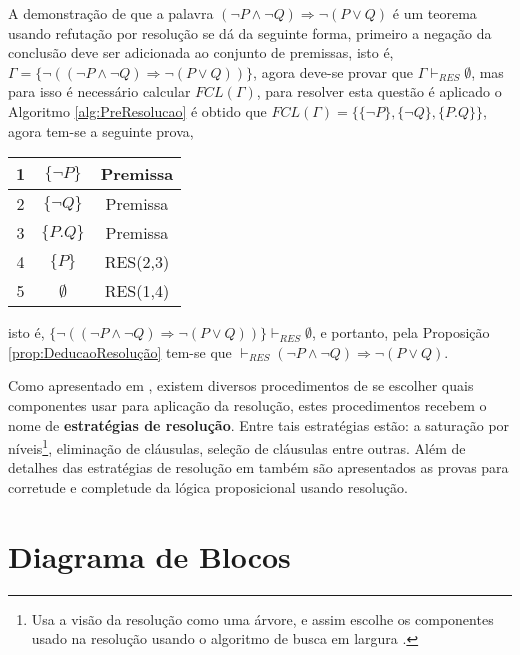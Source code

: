 \begin{exem}
    A demonstração de que a palavra $(\neg P \land \neg Q) \Rightarrow \neg (P \lor Q)$ é um teorema usando refutação por resolução se dá da seguinte forma, primeiro a negação da conclusão deve ser adicionada ao conjunto de premissas, isto é, $\Gamma = \{\neg((\neg P \land \neg Q) \Rightarrow \neg (P \lor Q))\}$, agora deve-se provar que $\Gamma \vdash_{RES} \emptyset$, mas para isso é necessário calcular $FCL(\Gamma)$, para resolver esta questão é aplicado o Algoritmo \ref{alg:PreResolucao} é obtido que $FCL(\Gamma) = \{\{\neg P\}, \{\neg Q\}, \{P. Q\}\}$, agora tem-se a seguinte prova, 
    \begin{table}[ht]
        \centering
        \begin{tabular}{|c|c|c|}
            \hline
            1 & $\{\neg P\}$ & Premissa \\ \hline
            2 & $\{\neg Q\}$ & Premissa \\ \hline
            3 & $\{P. Q\}$ & Premissa \\ \hline
            4 & $\{P\}$ & RES(2,3) \\ \hline
            5 & $\emptyset$ & RES(1,4) \\ \hline
        \end{tabular}
    \end{table}
    
    isto é, $\{\neg((\neg P \land \neg Q) \Rightarrow \neg (P \lor Q))\} \vdash_{RES} \emptyset$, e portanto, pela Proposição \ref{prop:DeducaoResolução} tem-se que $\vdash_{RES} (\neg P \land \neg Q) \Rightarrow \neg (P \lor Q)$.
\end{exem}

Como apresentado em \cite{joaoPavao2014}, existem diversos procedimentos de se escolher quais componentes usar para aplicação da resolução, estes procedimentos recebem o nome de \textbf{estratégias de resolução}. Entre tais estratégias estão: a saturação por níveis\footnote{Usa a visão da resolução como uma árvore, e assim escolhe os componentes usado na resolução usando o algoritmo de busca em largura \cite{jaime1994}.}, eliminação de cláusulas, seleção de cláusulas entre outras. Além de detalhes das estratégias de resolução em \cite{joaoPavao2014} também são apresentados as provas para corretude e completude da lógica proposicional usando resolução. 

\section{Diagrama de Blocos}


